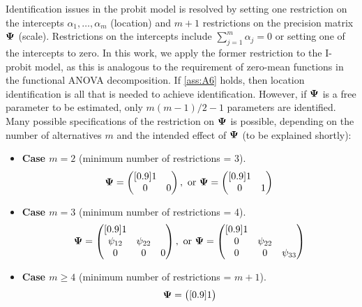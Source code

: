 Identification issues in the probit model is resolved by setting one restriction on the intercepts $\alpha_1,\dots,\alpha_m$ (location) and $m+1$ restrictions on the precision matrix ${\bm\Psi}$ (scale).
Restrictions on the intercepts include $\sum_{j=1}^m \alpha_j = 0$ or setting one of the intercepts to zero.
In this work, we apply the former restriction to the I-probit model, as this is analogous to the requirement of zero-mean functions in the functional ANOVA decomposition.
If \ref{ass:A6} holds, then location identification is all that is needed to achieve identification.
However, if ${\bm\Psi}$ is a free parameter to be estimated, only $m(m-1)/2-1$ parameters are identified.
Many possible specifications of the restriction on ${\bm\Psi}$ is possible, depending on the number of alternatives $m$ and the intended effect of ${\bm\Psi}$ (to be explained shortly):
\begin{itemize}
  \item \textbf{Case {\boldmath $m=2$}} (minimum number of restrictions = 3).
  \[
    \bPsi = 
    \begin{pmatrix}[0.9]
    1 & \\
    0 &0 \\  
    \end{pmatrix},
    \text{ or }
    \bPsi = 
    \begin{pmatrix}[0.9]
    1 & \\
    0 &1 \\  
    \end{pmatrix} \vspace{-0.45em}
  \]
  \item \textbf{Case {\boldmath $m=3$}} (minimum number of restrictions = 4).
  \[
    \bPsi = 
    \begin{pmatrix}[0.9]
    1 & \\
    \psi_{12} &\psi_{22} \\  
    0 &0 &0
    \end{pmatrix},
    \text{ or }
    \bPsi = 
    \begin{pmatrix}[0.9]
    1 & \\
    0 &\psi_{22}  \\  
    0 &0 &\psi_{33}  
    \end{pmatrix} \vspace{-0.55em}
  \]
    \item \textbf{Case {\boldmath $m\geq 4$}} (minimum number of restrictions = $m+1$).
  \[
    {\bm\Psi} = 
    \begin{pmatrix}[0.9]
    1                    \\

\end{pmatrix}\]
\end{itemize}
